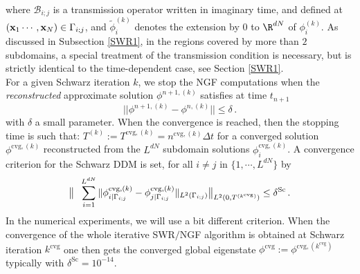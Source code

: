 where $\mathcal{B}_{i;j}$ is a transmission operator written in imaginary time, and defined at $({\bf x}_1\cdots,{\bf x}_N) \in \Gamma_{i;j}$, and  $\tilde{\phi}^{(k)}_i$ denotes the extension by $0$ to $\R^{dN}$ of $\phi^{(k)}_i$. As discussed in Subsection \ref{SWR1}, in the regions covered by more than $2$ subdomains, a special treatment of the transmission condition is necessary, but is strictly identical to the time-dependent case, see Section \ref{SWR1}.\\
For a given Schwarz iteration $k$, we stop the NGF computations when the {\it reconstructed} approximate solution $\phi^{n+1,(k)}$ satisfies at time $t_{n+1}$
\[
|| \phi^{n+1,(k)} - \phi^{n,(k)}||\leq \delta \, .
\]
with $\delta$ a small parameter.  When the convergence is reached, then the stopping time is such that:
$T^{(k)}:=T^{\textrm{cvg},(k)}=n^{\textrm{cvg},(k)}\Delta t$  for a converged solution $\phi^{\textrm{cvg},(k)}$ reconstructed from the $L^{dN}$ subdomain solutions $\phi_i^{\textrm{cvg},(k)}$. A convergence criterion for the Schwarz DDM is set, for all $i\neq j$ in $\{1,\cdots,L^{dN}\}$ by
\begin{eqnarray}\label{CVTOT2}
\big\| \hspace{0.2cm} \sum_{i=1}^{L^{dN}} \|\phi^{\textrm{cvg},(k)}_{i|\Gamma_{i;j}}-\phi^{\textrm{cvg},(k)}_{j|\Gamma_{i;j}}\|_{L^2(\Gamma_{i;j})}\big\|_{L^{2}(0,T^{(k^{\textrm{cvg}})})} \leq  \delta^{\textrm{Sc}} \,.
\end{eqnarray}
In the numerical experiments, we will use a bit different criterion. When the convergence of the whole iterative SWR$/$NGF algorithm is obtained at Schwarz iteration $k^{\textrm{cvg}}$ one then gets the converged global eigenstate $\phi^{\textrm{cvg}}:=\phi^{\textrm{cvg},(k^{\textrm{cvg}})}$ typically with $\delta^{\textrm{Sc}}=10^{-14}$.
